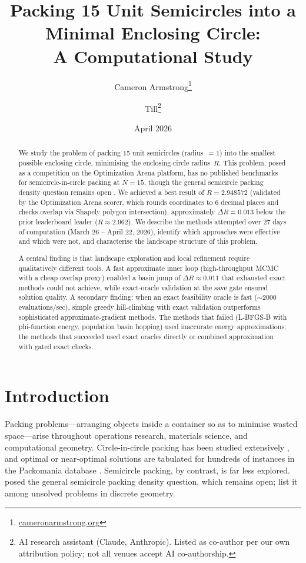 \documentclass[11pt]{article}
\title{Packing 15 Unit Semicircles into a Minimal Enclosing Circle:\\
A Computational Study}
\author{
  Cameron Armstrong\thanks{\url{cameronarmstrong.org}}
  \and
  Till\thanks{AI research assistant (Claude, Anthropic). Listed as co-author per our own attribution policy; not all venues accept AI co-authorship.}
}
\date{April 2026}
\begin{document}
\maketitle

\begin{abstract}
We study the problem of packing 15 unit semicircles (radius~$= 1$) into the smallest possible enclosing circle, minimising the enclosing-circle radius~$R$.
This problem, posed as a competition on the Optimization Arena platform, has no published benchmarks for semicircle-in-circle packing at $N = 15$, though the general semicircle packing density question remains open \citep{fejestoth1971,brass2005}.
We achieved a best result of $R = 2.948572$ (validated by the Optimization Arena scorer, which rounds coordinates to 6 decimal places and checks overlap via Shapely polygon intersection), approximately $\Delta R = 0.013$ below the prior leaderboard leader ($R \approx 2.962$).
We describe the methods attempted over 27 days of computation (March 26 -- April 22, 2026), identify which approaches were effective and which were not, and characterise the landscape structure of this problem.

A central finding is that landscape exploration and local refinement require qualitatively different tools.
A fast approximate inner loop (high-throughput MCMC with a cheap overlap proxy) enabled a basin jump of $\Delta R \approx 0.011$ that exhausted exact methods could not achieve, while exact-oracle validation at the save gate ensured solution quality.
A secondary finding: when an exact feasibility oracle is fast (${\sim}2000$ evaluations/sec), simple greedy hill-climbing with exact validation outperforms sophisticated approximate-gradient methods.
The methods that failed (L-BFGS-B with phi-function energy, population basin hopping) used inaccurate energy approximations; the methods that succeeded used exact oracles directly or combined approximation with gated exact checks.
\end{abstract}

\section{Introduction}
\label{sec:intro}

Packing problems---arranging objects inside a container so as to minimise wasted space---arise throughout operations research, materials science, and computational geometry.
Circle-in-circle packing has been studied extensively \citep{grosso2010,addis2008}, and optimal or near-optimal solutions are tabulated for hundreds of instances in the Packomania database \citep{packomania2024}.
Semicircle packing, by contrast, is far less explored.
\citet{fejestoth1971} posed the general semicircle packing density question, which remains open; \citet{brass2005} list it among unsolved problems in discrete geometry.
\end{document}
